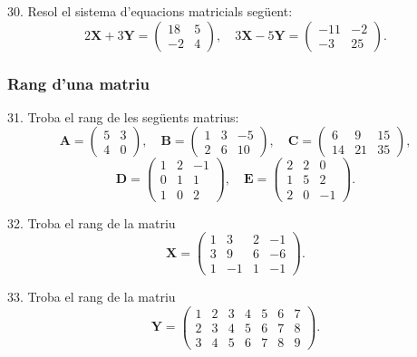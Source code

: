 \documentclass[12pt]{article}
\newcommand{\mat}[1]{\mathbf{#1}}
\begin{document}
\begin{exercici}
30. Resol el sistema d'equacions matricials següent:
\[
2\mat{X} + 3\mat{Y} = 
\begin{pmatrix}
18 & 5 \\
-2 & 4
\end{pmatrix}, \quad 
3\mat{X} - 5\mat{Y} = 
\begin{pmatrix}
-11 & -2 \\
-3 & 25
\end{pmatrix}.
\]
\end{exercici}

\subsubsection{Rang d'una matriu}
\begin{exercici}
31. Troba el rang de les següents matrius:
\[
\mat{A} = 
\begin{pmatrix}
5 & 3 \\
4 & 0
\end{pmatrix}, \quad 
\mat{B} = 
\begin{pmatrix}
1 & 3 & -5 \\
2 & 6 & 10
\end{pmatrix}, \quad 
\mat{C} = 
\begin{pmatrix}
6 & 9 & 15 \\
14 & 21 & 35
\end{pmatrix},
\]
\[
\mat{D} = 
\begin{pmatrix}
1 & 2 & -1 \\
0 & 1 & 1 \\
1 & 0 & 2
\end{pmatrix}, \quad 
\mat{E} = 
\begin{pmatrix}
2 & 2 & 0 \\
1 & 5 & 2 \\
2 & 0 & -1
\end{pmatrix}.
\]
\end{exercici}

\begin{exercici}
32. Troba el rang de la matriu
\[
\mat{X} = 
\begin{pmatrix}
1 & 3 & 2 & -1 \\
3 & 9 & 6 & -6 \\
1 & -1 & 1 & -1
\end{pmatrix}.
\]
\end{exercici}

\begin{exercici}
33. Troba el rang de la matriu
\[
\mat{Y} = 
\begin{pmatrix}
1 & 2 & 3 & 4 & 5 & 6 & 7 \\
2 & 3 & 4 & 5 & 6 & 7 & 8 \\
3 & 4 & 5 & 6 & 7 & 8 & 9
\end{pmatrix}.
\]
\end{exercici}
\end{document}
